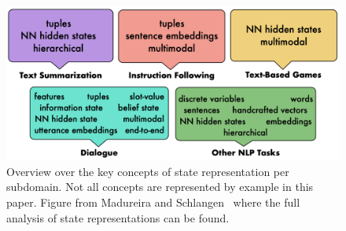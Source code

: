\documentclass[11pt]{article}
\begin{document}
\begin{figure}[h!]
\centering
\includegraphics[scale=.3]{img/states.png}
\caption{Overview over the key concepts of state representation per subdomain. Not all concepts are represented by example in this paper. Figure from Madureira and Schlangen~ where the full analysis of state representations can be found.}
\label{fig:states}
\end{figure}
\end{document}
